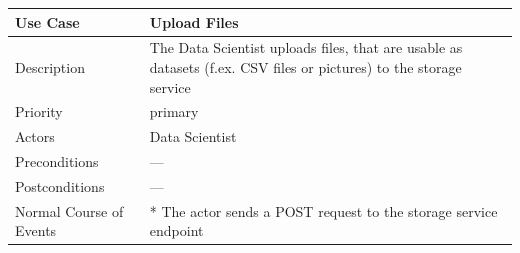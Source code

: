 \begin{longtable}[]{@{}ll@{}}
\toprule
\begin{minipage}[b]{0.27\columnwidth}\raggedright\strut
\textbf{Use Case}\strut
\end{minipage} & \begin{minipage}[b]{0.68\columnwidth}\raggedright\strut
Upload Files\strut
\end{minipage}\tabularnewline
\midrule
\endhead
\begin{minipage}[t]{0.27\columnwidth}\raggedright\strut
Description\strut
\end{minipage} & \begin{minipage}[t]{0.68\columnwidth}\raggedright\strut
The Data Scientist uploads files, that are usable as datasets (f.ex. CSV
files or pictures) to the storage service\strut
\end{minipage}\tabularnewline
\begin{minipage}[t]{0.27\columnwidth}\raggedright\strut
Priority\strut
\end{minipage} & \begin{minipage}[t]{0.68\columnwidth}\raggedright\strut
primary\strut
\end{minipage}\tabularnewline
\begin{minipage}[t]{0.27\columnwidth}\raggedright\strut
Actors\strut
\end{minipage} & \begin{minipage}[t]{0.68\columnwidth}\raggedright\strut
Data Scientist\strut
\end{minipage}\tabularnewline
\begin{minipage}[t]{0.27\columnwidth}\raggedright\strut
Preconditions\strut
\end{minipage} & \begin{minipage}[t]{0.68\columnwidth}\raggedright\strut
---\strut
\end{minipage}\tabularnewline
\begin{minipage}[t]{0.27\columnwidth}\raggedright\strut
Postconditions\strut
\end{minipage} & \begin{minipage}[t]{0.68\columnwidth}\raggedright\strut
---\strut
\end{minipage}\tabularnewline
\begin{minipage}[t]{0.27\columnwidth}\raggedright\strut
Normal Course of Events\strut
\end{minipage} & \begin{minipage}[t]{0.68\columnwidth}\raggedright\strut
* The actor sends a POST request to the storage service endpoint

\end{minipage}
\end{longtable}
